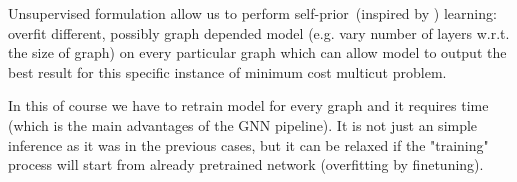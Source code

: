 \documentclass[10pt, twocolumn, a4paper]{article}
\theoremstyle{definition}
\begin{document}
Unsupervised formulation allow us to perform self-prior~(inspired by \citet{Hanocka2020p2m})
learning: overfit different, possibly graph depended model (e.g. vary
number of layers w.r.t. the size of graph) on every particular graph which
can allow model to output the best result for this specific instance of minimum cost multicut problem.

In this of course we have to retrain model for every
graph and it requires time (which is the main advantages of the GNN pipeline).
It is not just an simple inference as it was in the previous cases, but it can be
relaxed if the "training" process will start from already pretrained
network (overfitting by finetuning).



\end{document}
